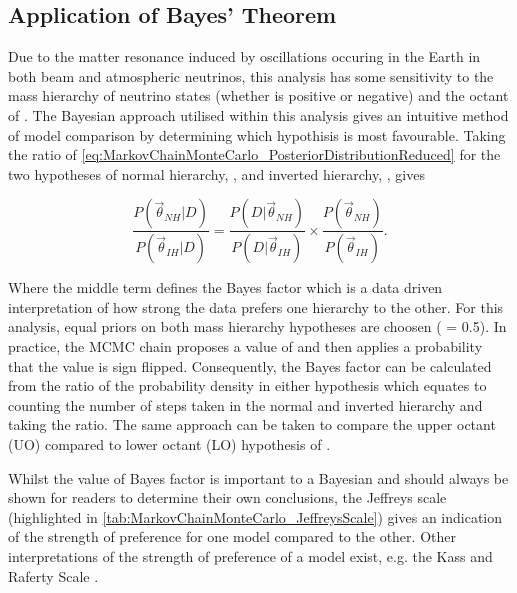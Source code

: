 \subsection{Application of Bayes' Theorem}
\label{sec:MarkovChainMonteCarlo_BayesTheorem}
Due to the matter resonance induced by oscillations occuring in the Earth in both beam and atmospheric neutrinos, this analysis has some sensitivity to the mass hierarchy of neutrino states (whether \delmsqatm is positive or negative) and the octant of \sinsqatm. The Bayesian approach utilised within this analysis gives an intuitive method of model comparison by determining which hypothisis is most favourable. Taking the ratio of \autoref{eq:MarkovChainMonteCarlo_PosteriorDistributionReduced} for the two hypotheses of normal hierarchy, , and inverted hierarchy, , gives

\begin{equation}
  \frac{P(\vec{\theta}_{NH}|D)}{P(\vec{\theta}_{IH}|D)} = \frac{P(D|\vec{\theta}_{NH})}{P(D|\vec{\theta}_{IH})} \times \frac{P(\vec{\theta}_{NH})}{P(\vec{\theta}_{IH})}.
\end{equation}

Where the middle term defines the Bayes factor which is a data driven interpretation of how strong the data prefers one hierarchy to the other. For this analysis, equal priors on both mass hierarchy hypotheses are choosen ( = 0.5). In practice, the MCMC chain proposes a value of \quickmath{|}\delmsqatm\quickmath{|} and then applies a  probability that the value is sign flipped. Consequently, the Bayes factor can be calculated from the ratio of the probability density in either hypothesis which equates to counting the number of steps taken in the normal and inverted hierarchy and taking the ratio. The same approach can be taken to compare the upper octant (UO) compared to lower octant (LO) hypothesis of \sinsqatm.

Whilst the value of Bayes factor is important to a Bayesian and should always be shown for readers to determine their own conclusions, the Jeffreys scale \cite{Jeffreys:1939xee} (highlighted in \autoref{tab:MarkovChainMonteCarlo_JeffreysScale}) gives an indication of the strength of preference for one model compared to the other. Other interpretations of the strength of preference of a model exist, e.g. the Kass and Raferty Scale \cite{Kass1995-nl}.

